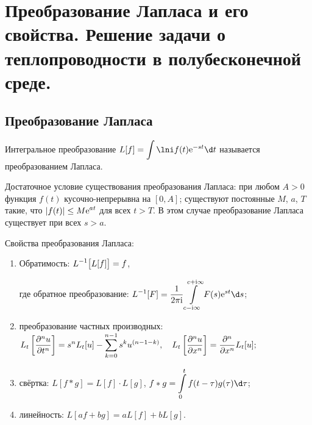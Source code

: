 \chapter{Преобразование Лапласа и его свойства. Решение задачи о
теплопроводности в полубесконечной среде.}

\section{Преобразование Лапласа}
Интегральное преобразование \( \ds L[f] = \int\lni f(t)\e^{-st}\d t \)
называется преобразованием Лапласа.

Достаточное условие существования преобразования Лапласа: при любом \( A > 0 \)
функция \( f(t) \) кусочно-непрерывна на \( [0, A] \); существуют постоянные
\( M \), \( a \), \( T \) такие, что \( \displaystyle |f(t)| \le M\mathrm{e}^{at} \) для всех
\( t > T \). В этом случае преобразование Лапласа существует при всех
\( s > a \).

Свойства преобразования Лапласа:
\begin{enumerate}
    \item Обратимость: \( \displaystyle L^{-1}\bigl[L[f]\bigr] = f \),
    
    где обратное преобразование: \( \ds L^{-1}[F] = \frac{1}{2\pi\i}
    \int\limits_{c-\i\infty}^{c+\i\infty} F(s)\e^{st}\d s \);
    
    \item преобразование частных производных:\\
    \(
        \displaystyle L_t\left[\frac{\partial^{n} u}{\partial t^{n}}\right] = s^nL_t[u] - 
        \sum\limits_{k=0}^{n-1} s^k u^{(n - 1 - k)},\quad 
        \displaystyle L_t\left[\frac{\partial^{n} u}{\partial x^{n}}\right] = \frac{\partial^{n} }{\partial x^{n}}L_t[u];
    \)
    
    \item свёртка: \( L[f*g] = L[f]\cdot L[g] \),
    \( \ds f*g = \int\limits_0^t f(t-\tau)g(\tau)\d\tau \);
    
    \item линейность: \( L[af + bg] = aL[f] + bL[g] \).
\end{enumerate}

